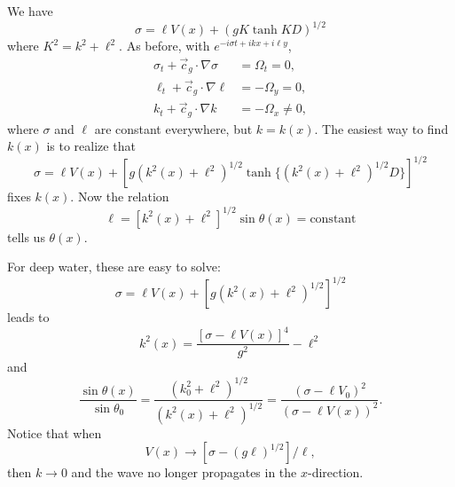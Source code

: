 We have
\[
	\sigma=\ell V(x)+(gK\tanh KD)^{1/2}
\]
where $K^2=k^2+\ell^2$. As before, with $e^{-i\sigma t+ikx+i\ell y}$,
\begin{align*}
	\sigma_t+\vec c_g\cdot\nabla\sigma & =\Omega_t=0,    \\
	\ell_t+\vec c_g\cdot\nabla\ell     & =-\Omega_y=0,   \\
	k_t+\vec c_g\cdot\nabla k          & =-\Omega_x\ne0,
\end{align*}
where $\sigma$ and $\ell$ are constant everywhere, but $k=k(x)$. The easiest way to find $k(x)$ is
to realize that
\[
	\sigma=\ell V(x)+[g(k^2(x)+\ell^2)^{1/2}\tanh\{(k^2(x)+\ell^2)^{1/2}D\}]^{1/2}
\]
fixes $k(x)$. Now the relation
\[
	\ell=[k^2(x)+\ell^2]^{1/2}\sin\theta(x)=\text{constant}
\]
tells us $\theta(x)$.

For deep water, these are easy to solve:
\[
	\sigma=\ell V(x)+[g(k^2(x)+\ell^2)^{1/2}]^{1/2}
\]
leads to
\[
	k^2(x)=\frac{[\sigma-\ell V(x)]^4}{g^2}-\ell^2
\]
and
\[
	\frac{\sin\theta(x)}{\sin\theta_0}
	=\frac{(k_0^2+\ell^2)^{1/2}}{(k^2(x)+\ell^2)^{1/2}}
	=\frac{(\sigma-\ell V_0)^2}{(\sigma-\ell V(x))^2}.
\]
Notice that when
\[
	V(x)\to[\sigma-(g\ell)^{1/2}]/\ell,
\]
then $k\to0$ and the wave no longer propagates in the $x$-direction.

